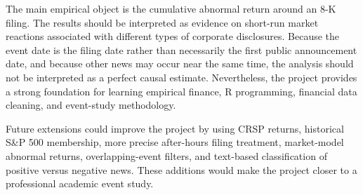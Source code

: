 \documentclass[12pt]{article}
\begin{document}
	The main empirical object is the cumulative abnormal return around an 8-K filing. The results should be interpreted as evidence on short-run market reactions associated with different types of corporate disclosures. Because the event date is the filing date rather than necessarily the first public announcement date, and because other news may occur near the same time, the analysis should not be interpreted as a perfect causal estimate. Nevertheless, the project provides a strong foundation for learning empirical finance, R programming, financial data cleaning, and event-study methodology.
	
	Future extensions could improve the project by using CRSP returns, historical S\&P 500 membership, more precise after-hours filing treatment, market-model abnormal returns, overlapping-event filters, and text-based classification of positive versus negative news. These additions would make the project closer to a professional academic event study.
	
\end{document}
